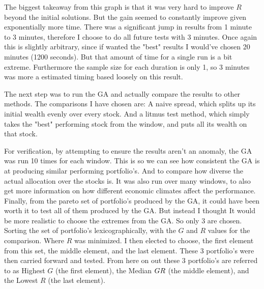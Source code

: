 \documentclass[11pt]{article}
\begin{document}
    The biggest takeaway from this graph is that it was very hard to improve \(R\) beyond
    the initial solutions. But the gain seemed to constantly improve given exponentially
    more time. There was a significant jump in results from 1 minute to 3 minutes,
    therefore I choose to do all future tests with 3 minutes. Once again this is slightly
    arbitrary, since if wanted the "best" results I would've chosen 20 minutes (1200 seconds).
    But that amount of time for a single run is a bit extreme. Furthermore the sample size for
    each duration is only 1, so 3 minutes was more a estimated timing based loosely
    on this result.

    The next step was to run the GA and actually compare the results to other methods.
    The comparisons I have chosen are: A naive spread, which splits up its initial wealth
    evenly over every stock. And a litmus test method, which simply takes the "best" performing
    stock from the window, and puts all its wealth on that stock.

    For verification, by attempting to ensure the results aren't an anomaly, the GA was run 10
    times for each window. This is so we can see how consistent the GA is at producing
    similar performing portfolio's. And to compare how diverse the actual allocation
    over the stocks is. It was also run over many windows, to also get more information
    on how different economic climates affect the performance. Finally, from the pareto
    set of portfolio's produced by the GA, it could have been worth it to test all
    of them produced by the GA. But instead I thought It would be more realistic to choose
    the extremes from the GA. So only 3 are chosen. Sorting the set of portfolio's
    lexicographically, with the \(G\) and \(R\) values for the comparison. Where \(R\)
    was minimized. I then elected to choose, the first element from this set, the middle
    element, and the last element. These 3 portfolio's were then carried forward and tested.
    From here on out these 3 portfolio's are referred to as Highest \(G\) (the first element),
    the Median \(G\/R\) (the middle element), and the Lowest \(R\) (the last element).
\end{document}
